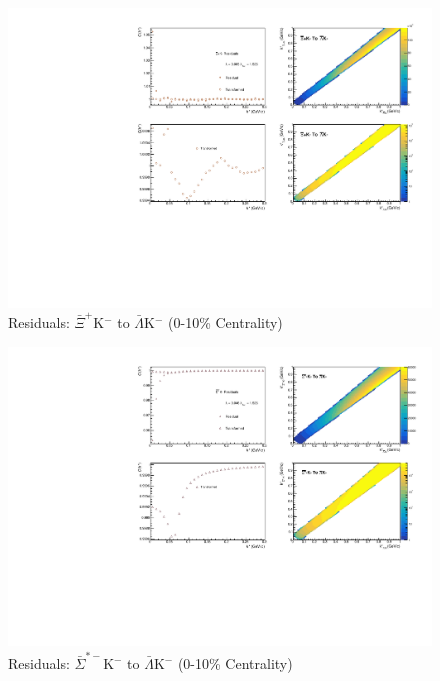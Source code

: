 \documentclass[../AnalysisNoteJBuxton.tex]{subfiles}
\begin{document}
\begin{figure}[h]
  \centering
  \includegraphics[width=\textwidth]{9_AdditionalFigures/Figures/Residuals/ALamKchM/Residuals_ALamKchM_0010_AXiKchM_MomResCrctn_NonFlatBgdCrctn_10Res_PrimMaxDecay4fm_UsingXiDataAndCoulombOnly.pdf}
  \caption[Residuals: $\bar{\Xi}^{+}$K$^{-}$ to $\bar{\Lambda}$K$^{-}$ (0-10\% Centrality)]{Residuals: $\bar{\Xi}^{+}$K$^{-}$ to $\bar{\Lambda}$K$^{-}$ (0-10\% Centrality)}
  \label{fig:Res_ALamKchM_0010_AXiCKchM}
\end{figure}


\begin{figure}[h]
  \centering
  \includegraphics[width=\textwidth]{9_AdditionalFigures/Figures/Residuals/ALamKchM/Residuals_ALamKchM_0010_ASigStMKchM_MomResCrctn_NonFlatBgdCrctn_10Res_PrimMaxDecay4fm_UsingXiDataAndCoulombOnly.pdf}
  \caption[Residuals: $\bar{\Sigma}^{*-}$K$^{-}$ to $\bar{\Lambda}$K$^{-}$ (0-10\% Centrality)]{Residuals: $\bar{\Sigma}^{*-}$K$^{-}$ to $\bar{\Lambda}$K$^{-}$ (0-10\% Centrality)}
  \label{fig:Res_ALamKchM_0010_ASigStMKchM}
\end{figure}
\end{document}
